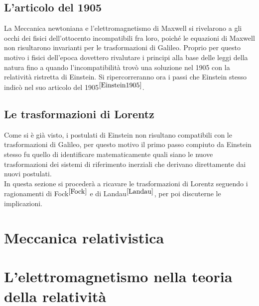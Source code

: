 \documentclass[12pt,a4paper]{report}
\numberwithin{equation}{section}
\begin{document}
\section{L'articolo del 1905}
La Meccanica newtoniana e l'elettromagnetismo di Maxwell si rivelarono a gli occhi dei fisici dell'ottocento 
incompatibili fra loro, 
poiché le equazioni di Maxwell non risultarono invarianti per le trasformazioni di Galileo. 
Proprio per questo motivo i fisici dell'epoca dovettero rivalutare i principi alla base delle leggi 
della natura fino a quando l'incompatibilità trovò una soluzione nel 1905 con la relatività ristretta di Einstein.
 Si ripercorreranno ora i passi che Einstein stesso indicò nel suo articolo del 1905$^{\cite{Einstein1905}}$.



\section{Le trasformazioni di Lorentz}
Come si è già visto, i postulati di Einstein non risultano compatibili con le trasformazioni di Galileo, 
per questo motivo il primo passo compiuto da Einstein stesso fu quello di identificare matematicamente quali siano 
le nuove trasformazioni dei sistemi di riferimento inerziali che derivano direttamente dai nuovi postulati.\\
In questa sezione si procederà a ricavare le trasformazioni di Lorentz seguendo i ragionamenti di Fock$^{\cite{Fock}}$ e di Landau$ ^{\cite{Landau}}$, 
per poi discuterne le implicazioni.  




\chapter{Meccanica relativistica}

\chapter{L'elettromagnetismo nella teoria della relatività}

\appendix




\end{document}
